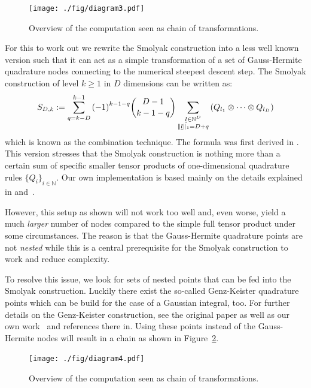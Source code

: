 \documentclass[a4paper,10pt]{article}
\begin{document}
\begin{figure}[h!]
  \centering
  \texttt{[image: ./fig/diagram3.pdf]}
  \caption{Overview of the computation seen as chain of transformations.}
  \label{fig:transformation_chain_3}
\end{figure}

For this to work out we rewrite the Smolyak construction into a less well known
version such that it can act as a simple transformation of a set of Gauss-Hermite
quadrature nodes connecting to the numerical steepest descent step. The Smolyak
construction of level $k \geq 1$ in $D$ dimensions can be written as:
\begin{equation*}
  S_{D,k} := \sum_{q=k-D}^{k-1} {(-1)}^{k-1-q} \binom{D-1}{k-1-q}
                  \sum_{\substack{\underline{l} \in \mathbb{N}^D \\
                                  \|\underline{l}\|_1 = D+q}}
                  \left(Q_{l_1} \otimes \cdots \otimes Q_{l_D}\right)
\end{equation*}
which is known as the combination technique. The formula was first derived in
\cite{Wasilkowski_Wozniakowski_95}. This version stresses that the Smolyak
construction is nothing more than a certain sum of specific smaller tensor
products of one-dimensional quadrature rules ${\{Q_i\}}_{i \in\mathbb{N}}$.
Our own implementation is based mainly on the details explained in
\cite{Heiss_Winschel_08} and~\cite{Gerstner_Griebel_98}.

However, this setup as shown will not work too well and, even worse, yield
a much \emph{larger} number of nodes compared to the simple full tensor
product under some circumstances. The reason is that the Gauss-Hermite
quadrature points are not \emph{nested} while this is a central prerequisite
for the Smolyak construction to work and reduce complexity.

To resolve this issue, we look for sets of nested points that can be fed
into the Smolyak construction. Luckily there exist the so-called Genz-Keister
quadrature points which can be build for the case of a Gaussian integral, too.
For further details on the Genz-Keister construction, see the original paper
\cite{genz_keister} as well as our own work~\cite{B_kes} and references there in.
Using these points instead of the Gauss-Hermite nodes will result in a chain
as shown in Figure~\ref{fig:transformation_chain_4}.

\begin{figure}[h!]
  \centering
  \texttt{[image: ./fig/diagram4.pdf]}
  \caption{Overview of the computation seen as chain of transformations.}
  \label{fig:transformation_chain_4}
\end{figure}
\end{document}
